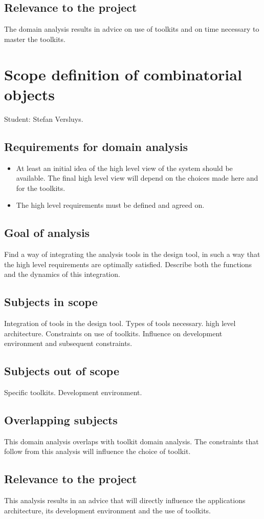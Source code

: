 \documentclass[a4paper,11pt]{article}
\begin{document}
\subsection{Relevance to the project}
The domain analysis results in advice on use of toolkits and on time necessary to master the toolkits.

\section{Scope definition of combinatorial objects}
Student: Stefan Versluys.
\subsection{Requirements for domain analysis}
\begin{itemize}
    \item At least an initial idea of the high level view of the system should be available. The final high level
	    view will depend on the choices made here and for the toolkits.
    \item The high level requirements must be defined and agreed on.
\end{itemize}
\subsection{Goal of analysis}
Find a way of integrating the analysis tools in the design tool, in such a way
that the high level requirements are optimally satisfied. Describe both the functions
and the dynamics of this integration.
\subsection{Subjects in scope}
Integration of tools in the design tool. Types of tools necessary.
high level architecture. Constraints on use of toolkits. Influence on development environment and subsequent constraints.
\subsection{Subjects out of scope}
Specific toolkits. Development environment.
\subsection{Overlapping subjects}
This domain analysis overlaps with toolkit domain analysis. The constraints that follow from this analysis
will influence the choice of toolkit.
\subsection{Relevance to the project}
This analysis results in an advice that will directly influence the applications architecture, its development environment
and the use of toolkits.
\end{document}
